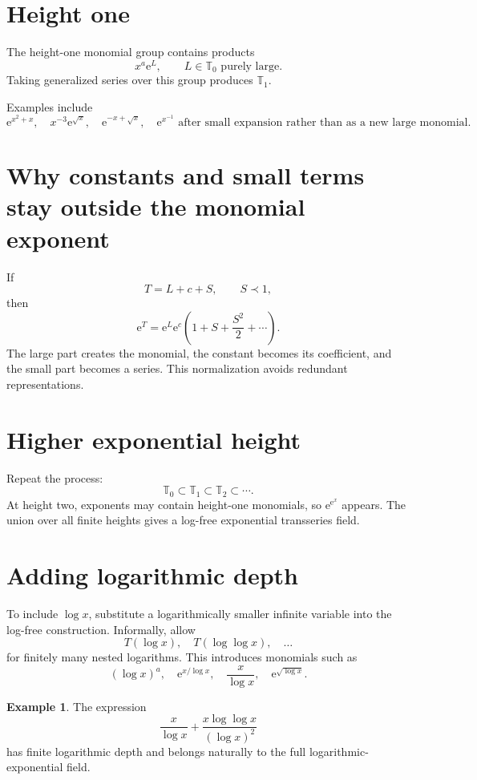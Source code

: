 \documentclass[11pt,oneside,openany]{book}
\newcommand{\T}{\mathbb{T}}
\newcommand{\e}{\mathrm{e}}
\theoremstyle{plain}
\theoremstyle{definition}
\newtheorem{example}[theorem]{Example}
\theoremstyle{remark}
\begin{document}
\section{Height one}
The height-one monomial group contains products
\[
  x^a\e^L,
  \qquad L\in\T_0\text{ purely large}.
\]
Taking generalized series over this group produces $\T_1$.

Examples include
\[
  \e^{x^2+x},
  \quad x^{-3}\e^{\sqrt{x}},
  \quad\e^{-x+\sqrt{x}},
  \quad\e^{x^{-1}}\text{ after small expansion rather than as a new large monomial}.
\]

\section{Why constants and small terms stay outside the monomial exponent}
If
\[
  T=L+c+S,
  \qquad S\prec1,
\]
then
\[
  \e^T=\e^L\e^c\left(1+S+\frac{S^2}{2}+\cdots\right).
\]
The large part creates the monomial, the constant becomes its coefficient, and the small part becomes a series. This normalization avoids redundant representations.

\section{Higher exponential height}
Repeat the process:
\[
  \T_0\subset\T_1\subset\T_2\subset\cdots.
\]
At height two, exponents may contain height-one monomials, so $\e^{\e^x}$ appears. The union over all finite heights gives a log-free exponential transseries field.

\section{Adding logarithmic depth}
To include $\log x$, substitute a logarithmically smaller infinite variable into the log-free construction. Informally, allow
\[
  T(\log x),
  \quad T(\log\log x),
  \quad\ldots
\]
for finitely many nested logarithms. This introduces monomials such as
\[
  (\log x)^a,
  \quad\e^{x/\log x},
  \quad\frac{x}{\log x},
  \quad\e^{\sqrt{\log x}}.
\]

\begin{example}
The expression
\[
  \frac{x}{\log x}+
  \frac{x\log\log x}{(\log x)^2}
\]
has finite logarithmic depth and belongs naturally to the full logarithmic-exponential field.
\end{example}
\end{document}
